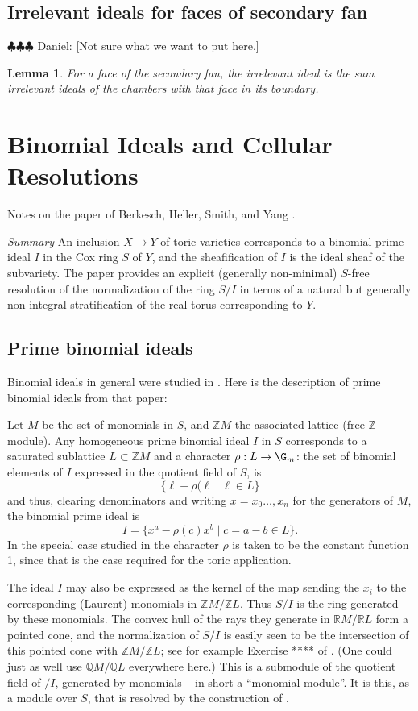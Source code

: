\documentclass[11pt]{amsart}
\numberwithin{equation}{section}
\newtheorem{lemma}[equation]{Lemma}
\theoremstyle{definition}
\theoremstyle{remark}
\newcommand{\ZZ}{\mathbb Z}
\newcommand{\QQ}{\mathbb Q}
\newcommand{\RR}{\mathbb R}
\newcommand{\daniel}[1]{{\color{blue} \sf $\clubsuit\clubsuit\clubsuit$ Daniel: [#1]}}
\begin{document}
\subsection{Irrelevant ideals for faces of secondary fan}
\daniel{Not sure what we want to put here.}
\begin{lemma}
    For a face of the secondary fan, the irrelevant ideal is the sum irrelevant ideals of the chambers with that face in its boundary.
\end{lemma}

\section{Binomial Ideals and Cellular Resolutions}
Notes on the paper of Berkesch, Heller, Smith, and Yang \cite{BCHSY}.
\medskip

\noindent\emph{Summary} An inclusion $X \to Y$ of toric varieties corresponds to a binomial prime ideal $I$ in the Cox ring $S$ of $Y$, and the
sheafification of $I$ is the ideal sheaf of the subvariety. The paper \cite{BCHSY}  provides an explicit (generally non-minimal) $S$-free resolution of the normalization of the ring $S/I$ in terms of a natural but generally non-integral stratification of the real torus corresponding to $Y$. 

\subsection{Prime binomial ideals}
Binomial ideals in general were studied in \cite{Eisenbud-Sturmfels}. Here is the description of prime binomial ideals from that paper: 

Let $M$ be the set of monomials in $S$, and $\ZZ M$ the associated lattice (free $\ZZ$-module). Any homogeneous  prime binomial ideal $I$ in $S$ corresponds to 
a saturated sublattice $L\subset \ZZ M$ and a character $\rho: L\to \G_{m}$: the set of binomial elements of $I$
expressed in the quotient field of $S$, is
$$
\{\ell - \rho(\ell \mid \ell \in L\}
$$
and thus, clearing denominators and writing $x = x_{0}\dots, x_{n}$ for the generators of $M$, the binomial prime ideal is
$$
I = \{x^{a} -\rho(c) x^{b} \mid c = a-b \in L\}.
$$
In the special case studied in \cite{BCHSY} the character $\rho$ is taken to be the constant function 1, since that is the case required for the toric application.

The ideal $I$ may also be expressed as the kernel of the map sending the $x_{i}$ to
the corresponding (Laurent) monomials in $\ZZ M/\ZZ L$. Thus  $S/I$ is the ring generated by these monomials. The convex hull 
of the rays they generate in $\RR M/\RR L$ form a pointed cone, and the normalization
of $S/I$ is easily seen to be the intersection of this pointed cone with 
$\ZZ M/\ZZ L$; see for example Exercise **** of \cite{EisenbudCA}. (One could just as well use $\QQ M/\QQ L$ everywhere here.) This is a submodule of the quotient field
of $/I$, generated by monomials -- in short a ``monomial module''. It is this, as a module over $S$, that is resolved by the construction of \cite{BCHSY}.
\end{document}
